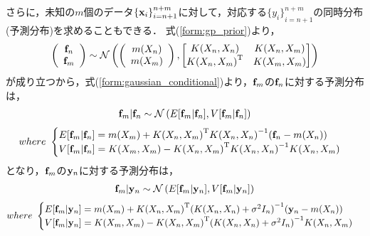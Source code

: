 \documentclass[11pt,a4j]{jarticle}
\begin{document}
      さらに，未知の$m$個のデータ${\{ {\bf x}_i \} }_{i=n+1}^{n+m}$に対して，対応する${\{ y_i \} }_{i=n+1}^{n+m}$の同時分布(予測分布)を求めることもできる．
      式(\ref{form:gp_prior})より，
      \begin{align}
        \left(
          \begin{array}{c}
            {\bf f}_n \\ {\bf f}_m
          \end{array}
        \right)
        \sim
        \mathcal{N} 
        \left(
          \left(
            \begin{array}{c}
              m(X_n) \\ m(X_m)
            \end{array}
          \right)
          ,
          \begin{bmatrix}
            K(X_n,X_n) & K(X_n,X_m) \\
            {K(X_n,X_m)}^{\mathrm{T}} & K(X_m,X_m)
          \end{bmatrix}
        \right)
      \end{align}
      が成り立つから，式(\ref{form:gaussian_conditional})より，${\bf f}_m$の${\bf f}_n$に対する予測分布は，
      \begin{align}
        {\bf f}_m | {\bf f}_n \sim \mathcal{N}\left( E[{\bf f}_m | {\bf f}_n], V[{\bf f}_m | {\bf f}_n] \right) 
      \end{align}
      \begin{align}          
        where ~ 
        \begin{cases}
          E[{\bf f}_m | {\bf f}_n] = m(X_m) + {K(X_n,X_m)}^{\mathrm{T}} {K(X_n,X_n)}^{-1} ( {\bf f}_n - m(X_n) ) \\
          V[{\bf f}_m | {\bf f}_n] = K(X_m,X_m) - {K(X_n,X_m)}^{\mathrm{T}} {K(X_n,X_n)}^{-1} K(X_n,X_m)
        \end{cases} \nonumber
      \end{align}
      となり，${\bf f}_m$の${\bf y}_n$に対する予測分布は，
      \begin{align}
        {\bf f}_m | {\bf y}_n \sim \mathcal{N}\left( E[{\bf f}_m | {\bf y}_n], V[{\bf f}_m | {\bf y}_n] \right) 
      \end{align}
      \begin{align}          
        where ~ 
        \begin{cases}
          E[{\bf f}_m | {\bf y}_n] = m(X_m) + {K(X_n,X_m)}^{\mathrm{T}} {( K(X_n,X_n) + \sigma^2 I_n )} ^{-1} ( {\bf y}_n - m(X_n) ) \\
          V[{\bf f}_m | {\bf y}_n] = K(X_m,X_m) - {K(X_n,X_m)}^{\mathrm{T}} { ( K(X_n,X_n) + \sigma^2 I_n ) }^{-1} K(X_n,X_m)
        \end{cases} \nonumber
      \end{align}
\end{document}
